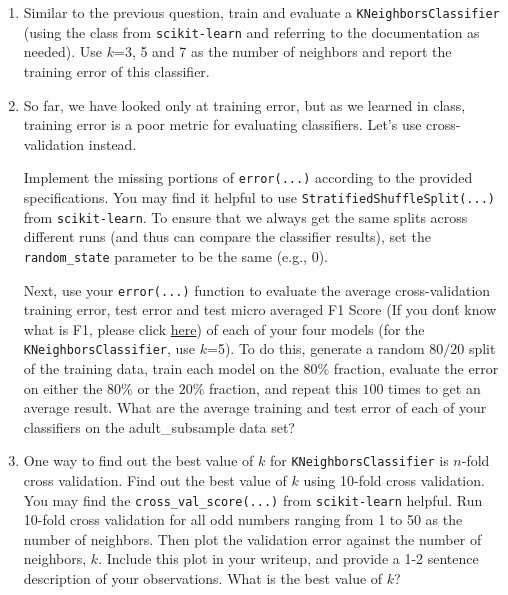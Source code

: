 \begin{enumerate}[resume]
\sol{}

\item {} Similar to the previous question, train and evaluate a \verb|KNeighborsClassifier| (using the class from \verb|scikit-learn| and referring to the documentation as needed). Use $k$=3, 5 and 7 as the number of neighbors and report the training error of this classifier.

\sol{}

\item {} So far, we have looked only at training error, but as we learned in class, training error is a poor metric for evaluating classifiers. Let's use cross-validation instead.

Implement the missing portions of \verb|error(...)| according to the provided specifications. You may find it helpful to use \verb|StratifiedShuffleSplit(...)| from \verb|scikit-learn|. To ensure that we always get the same splits across different runs (and thus can compare the classifier results), set the \verb|random_state| parameter to be the same (e.g., 0).


Next, use your \verb|error(...)| function to evaluate the average cross-validation training error, test error and test micro averaged F1 Score (If you don\'t know what is F1, please click \href{https://scikit-learn.org/stable/modules/generated/sklearn.metrics.f1_score.html?highlight=f1\%20score#sklearn.metrics.f1_score}{here}) of each of your four models (for the \verb|KNeighborsClassifier|, use $k$=5). To do this, generate a random $80/20$ split of the training data, train each model on the $80\%$ fraction, evaluate the error on either the $80\%$ or the $20\%$ fraction, and repeat this $100$ times to get an average result. What are the average training and test error of each of your classifiers on the adult\_subsample data set?

\sol{}


\item {} One way to find out the best value of $k$ for \verb|KNeighborsClassifier| is $n$-fold cross validation.
Find out the best value of $k$ using 10-fold cross validation. You may find the \verb|cross_val_score(...)| from \verb|scikit-learn| helpful. Run 10-fold cross validation for all odd numbers ranging from 1 to 50 as the number of neighbors.
Then plot the validation error against the number of neighbors, $k$.
Include this plot in your writeup, and provide a 1-2 sentence description of your observations. What is the best value of $k$?


\end{enumerate}
